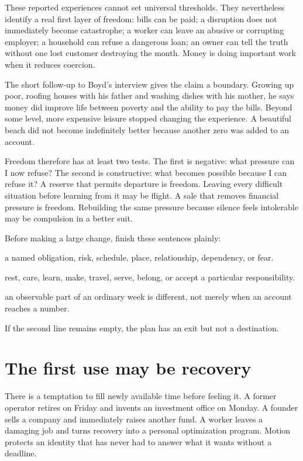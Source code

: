 These reported experiences cannot set universal thresholds. They nevertheless
identify a real first layer of freedom: bills can be paid; a disruption does
not immediately become catastrophe; a worker can leave an abusive or
corrupting employer; a household can refuse a dangerous loan; an owner can
tell the truth without one lost customer destroying the month. Money is doing
important work when it reduces coercion.

The short follow-up to Boyd's interview gives the claim a boundary. Growing up
poor, roofing houses with his father and washing dishes with his mother, he
says money did improve life between poverty and the ability to pay the bills.
Beyond some level, more expensive leisure stopped changing the experience. A
beautiful beach did not become indefinitely better because another zero was
added to an account.

Freedom therefore has at least two tests. The first is negative: what pressure
can I now refuse? The second is constructive: what becomes possible because I
can refuse it? A reserve that permits departure is freedom. Leaving every
difficult situation before learning from it may be flight. A sale that removes
financial pressure is freedom. Rebuilding the same pressure because silence
feels intolerable may be compulsion in a better suit.

Before making a large change, finish these sentences plainly:

\begin{description}[leftmargin=2.6em,style=nextline]
\item[I want freedom from] a named obligation, risk, schedule, place,
  relationship, dependency, or fear.
\item[I want freedom to] rest, care, learn, make, travel, serve, belong, or
  accept a particular responsibility.
\item[I will know the change worked when] an observable part of an ordinary
  week is different, not merely when an account reaches a number.
\end{description}

If the second line remains empty, the plan has an exit but not a destination.

\section{The first use may be recovery}

There is a temptation to fill newly available time before feeling it. A former
operator retires on Friday and invents an investment office on Monday. A
founder sells a company and immediately raises another fund. A worker leaves a
damaging job and turns recovery into a personal optimization program. Motion
protects an identity that has never had to answer what it wants without a
deadline.

